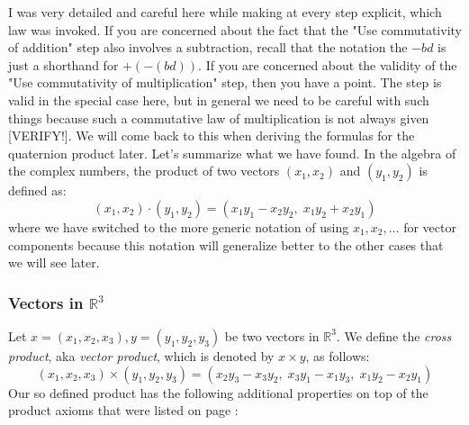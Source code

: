 I was very detailed and careful here while making at every step explicit, which law was invoked. If you are concerned about the fact that the "Use commutativity of addition" step also involves a subtraction, recall that the notation the $- bd$ is just a shorthand for $+ (-(bd))$. If you are concerned about the validity of the "Use commutativity of multiplication" step, then you have a point. The step is valid in the special case here, but in general we need to be careful with such things because such a commutative law of multiplication is not always given [VERIFY!]. We will come back to this when deriving the formulas for the quaternion product later. Let's summarize what we have found. In the algebra of the complex numbers, the product of two vectors $(x_1,x_2)$ and $(y_1,y_2)$ is defined as:
\begin{equation}
(x_1,x_2) \cdot (y_1,y_2) = (x_1 y_1 - x_2 y_2, \; x_1 y_2 + x_2 y_1)
\end{equation}
where we have switched to the more generic notation of using $x_1,x_2,\ldots$ for vector components because this notation will generalize better to the other cases that we will see later.






\subsubsection{Vectors in $\mathbb{R}^3$}
Let $x = (x_1,x_2,x_3), y = (y_1,y_2,y_3)$ be two vectors in $\mathbb{R}^3$. We define the \emph{cross product}, aka \emph{vector product}, which is denoted by $x \times y$, as follows:
\begin{equation}
(x_1,x_2,x_3) \times (y_1,y_2,y_3) =
(x_2 y_3 - x_3 y_2, \; x_3 y_1 - x_1 y_3, \; x_1 y_2 - x_2 y_1)
\end{equation}
Our so defined product has the following additional properties on top of the product axioms that were listed on page \pageref{Def:ProductAxioms}: 

